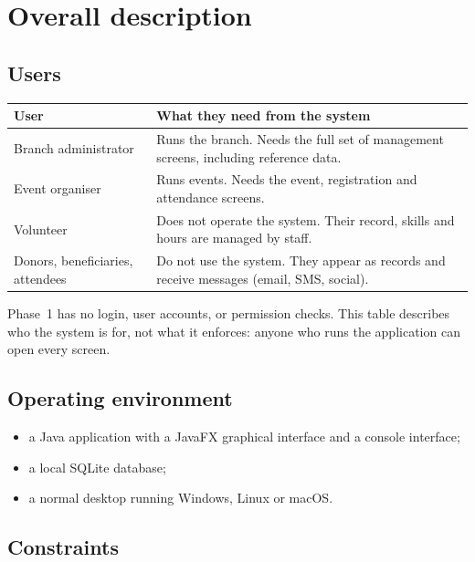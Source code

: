 \section{Overall description}

\subsection{Users}

\begin{center}
\small
\begin{tabularx}{\textwidth}{@{}L{0.28\textwidth}Y@{}}
\toprule
\textbf{User} & \textbf{What they need from the system} \\
\midrule
Branch administrator & Runs the branch. Needs the full set of management screens, including reference data. \\
Event organiser & Runs events. Needs the event, registration and attendance screens. \\
Volunteer & Does not operate the system. Their record, skills and hours are managed by staff. \\
Donors, beneficiaries, attendees & Do not use the system. They appear as records and receive messages (email, SMS, social). \\
\bottomrule
\end{tabularx}
\end{center}

Phase~1 has no login, user accounts, or permission checks. This table describes who the system is for, not what it enforces: anyone who runs the application can open every screen.

\subsection{Operating environment}

\begin{itemize}
  \item a Java application with a JavaFX graphical interface and a console interface;
  \item a local SQLite database;
  \item a normal desktop running Windows, Linux or macOS.
\end{itemize}

\subsection{Constraints}

